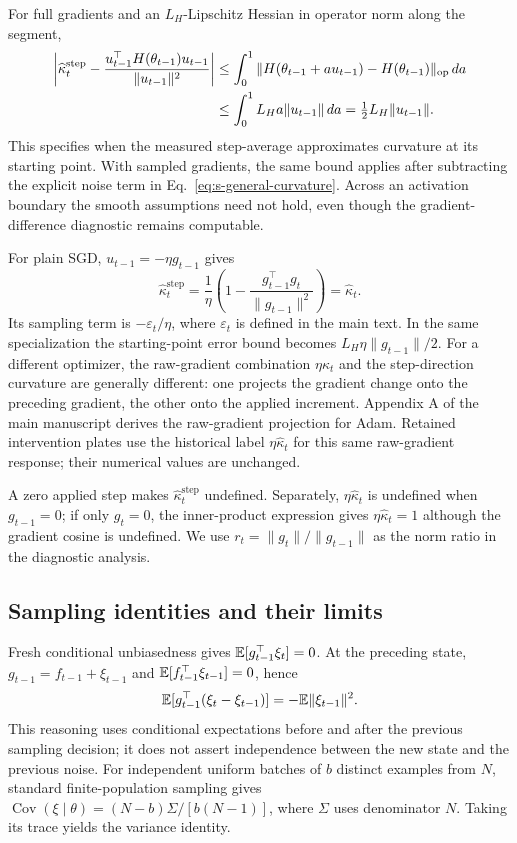 For full gradients and an $L_H$-Lipschitz Hessian in operator norm along the segment,
\begin{align}
 \left|\widehat\kappa_t^{\mathrm{step}}-
 \frac{u_{t-1}^{\top}H(\theta_{t-1})u_{t-1}}{\|u_{t-1}\|^2}\right|
 &\leq\int_0^1\|H(\theta_{t-1}+a u_{t-1})-H(\theta_{t-1})\|_{\rm op}\,da\notag\\
 &\leq\int_0^1L_Ha\|u_{t-1}\|\,da
 =\tfrac12L_H\|u_{t-1}\|.
\end{align}
This specifies when the measured step-average approximates curvature at its starting point. With sampled gradients, the same bound applies after subtracting the explicit noise term in Eq.~\eqref{eq:s-general-curvature}. Across an activation boundary the smooth assumptions need not hold, even though the gradient-difference diagnostic remains computable.

For plain SGD, $u_{t-1}=-\eta g_{t-1}$ gives
\begin{equation}
 \widehat\kappa_t^{\mathrm{step}}
 =\frac{1}{\eta}\left(1-\frac{g_{t-1}^{\top}g_t}{\|g_{t-1}\|^2}\right)
 =\widehat\kappa_t.
\end{equation}
Its sampling term is $-\varepsilon_t/\eta$, where $\varepsilon_t$ is defined in the main text. In the same specialization the starting-point error bound becomes $L_H\eta\|g_{t-1}\|/2$. For a different optimizer, the raw-gradient combination $\eta\widehat\kappa_t$ and the step-direction curvature are generally different: one projects the gradient change onto the preceding gradient, the other onto the applied increment. Appendix A of the main manuscript derives the raw-gradient projection for Adam. Retained intervention plates use the historical label $\eta\widehat\kappa_t$ for this same raw-gradient response; their numerical values are unchanged.

A zero applied step makes $\widehat\kappa_t^{\mathrm{step}}$ undefined. Separately, $\eta\widehat\kappa_t$ is undefined when $g_{t-1}=0$; if only $g_t=0$, the inner-product expression gives $\eta\widehat\kappa_t=1$ although the gradient cosine is undefined. We use $r_t=\|g_t\|/\|g_{t-1}\|$ as the norm ratio in the diagnostic analysis.

\subsection{Sampling identities and their limits}
Fresh conditional unbiasedness gives $\mathbb{E}[g_{t-1}^\top\xi_t]=0$. At the preceding state, $g_{t-1}=f_{t-1}+\xi_{t-1}$ and $\mathbb{E}[f_{t-1}^\top\xi_{t-1}]=0$, hence
\begin{equation}
 \mathbb{E}[g_{t-1}^\top(\xi_t-\xi_{t-1})]=-\mathbb{E}\|\xi_{t-1}\|^2.
\end{equation}
This reasoning uses conditional expectations before and after the previous sampling decision; it does not assert independence between the new state and the previous noise. For independent uniform batches of $b$ distinct examples from $N$, standard finite-population sampling gives $\operatorname{Cov}(\xi\mid\theta)=(N-b)\Sigma/[b(N-1)]$, where $\Sigma$ uses denominator $N$. Taking its trace yields the variance identity.

